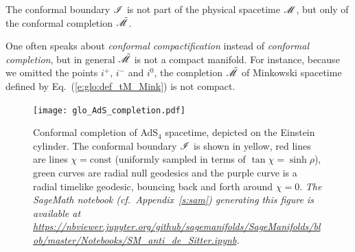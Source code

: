 \begin{remark}
The conformal boundary $\mathscr{I}$ is not part of the physical spacetime
$\mathscr{M}$, but only of the conformal completion $\tilde{\mathscr{M}}$.
\end{remark}

\begin{remark}
One often speaks about
\emph{conformal compactification}
instead of \emph{conformal completion}, but in general $\tilde{\mathscr{M}}$ is not a
compact manifold. For instance, because we omitted the points $i^+$, $i^-$ and $i^0$,
the completion $\tilde{\mathscr{M}}$ of Minkowski spacetime defined by Eq.~(\ref{e:glo:def_tM_Mink})
is not compact.
\end{remark}

\begin{figure}
\centerline{\texttt{[image: glo\_AdS\_completion.pdf]}}
\caption[]{\label{f:glo:AdS_completion} \footnotesize
Conformal completion of AdS$_{4}$ spacetime, depicted on the Einstein cylinder.
The conformal boundary $\mathscr{I}$ is shown in yellow, red lines are lines
$\chi=\mathrm{const}$ (uniformly sampled in terms of $\tan\chi = \sinh\rho$),
green curves are radial null geodesics and the purple curve
is a radial timelike geodesic, bouncing back and forth around $\chi=0$.
\textsl{The SageMath notebook (cf.~Appendix~\ref{s:sam}) generating this figure
is available at {\scriptsize \url{https://nbviewer.jupyter.org/github/sagemanifolds/SageManifolds/blob/master/Notebooks/SM_anti_de_Sitter.ipynb}}.}}
\end{figure}

